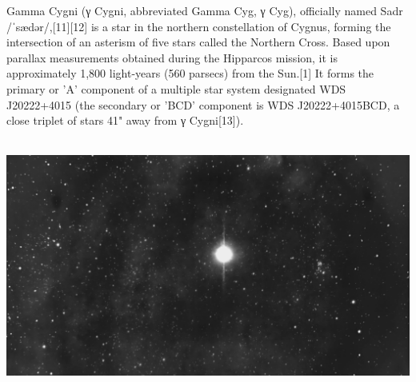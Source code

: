 {\footnotesize\color{white}
Gamma Cygni (γ Cygni, abbreviated Gamma Cyg, γ Cyg), officially named Sadr /ˈsædər/,[11][12] is a star in the northern constellation of Cygnus, forming the intersection of an asterism of five stars called the Northern Cross. Based upon parallax measurements obtained during the Hipparcos mission, it is approximately 1,800 light-years (560 parsecs) from the Sun.[1] It forms the primary or 'A' component of a multiple star system designated WDS J20222+4015 (the secondary or 'BCD' component is WDS J20222+4015BCD, a close triplet of stars 41" away from γ Cygni[13]).




}\ \\
\includegraphics[width=\textwidth]{../Imaging//Grayscale/Sadr_Star.jpg}
